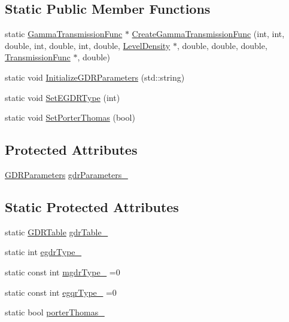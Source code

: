 \subsection*{Static Public Member Functions}
\begin{DoxyCompactItemize}
\item 
static \hyperlink{classGammaTransmissionFunc}{Gamma\-Transmission\-Func} $\ast$ \hyperlink{classGammaTransmissionFunc_af9113434ffae5b7a9ef26ee4edffa9e2}{Create\-Gamma\-Transmission\-Func} (int, int, double, int, double, int, double, \hyperlink{classLevelDensity}{Level\-Density} $\ast$, double, double, double, \hyperlink{classTransmissionFunc}{Transmission\-Func} $\ast$, double)
\item 
static void \hyperlink{classGammaTransmissionFunc_a2e092550258a4f83308f5177230f9ddd}{Initialize\-G\-D\-R\-Parameters} (std\-::string)
\item 
static void \hyperlink{classGammaTransmissionFunc_a3d7d2c3839a6f793a199d86aa17fcecf}{Set\-E\-G\-D\-R\-Type} (int)
\item 
static void \hyperlink{classGammaTransmissionFunc_ad18fc61af1d1f2f1873072456914d62f}{Set\-Porter\-Thomas} (bool)
\end{DoxyCompactItemize}
\subsection*{Protected Attributes}
\begin{DoxyCompactItemize}
\item 
\hyperlink{classGDRParameters}{G\-D\-R\-Parameters} \hyperlink{classGammaTransmissionFunc_a2fc3e55f03a93237061ef5c72077e007}{gdr\-Parameters\-\_\-}
\end{DoxyCompactItemize}
\subsection*{Static Protected Attributes}
\begin{DoxyCompactItemize}
\item 
static \hyperlink{GammaTransmissionFunc_8h_a28a4ad6d778738bd683db90f04b8c50d}{G\-D\-R\-Table} \hyperlink{classGammaTransmissionFunc_a1ce4515fa2b9343208d5a419b3a8a486}{gdr\-Table\-\_\-}
\item 
static int \hyperlink{classGammaTransmissionFunc_a8cad0e61b388a779ef5dceba294e8687}{egdr\-Type\-\_\-}
\item 
static const int \hyperlink{classGammaTransmissionFunc_ae885f247bb9f13b1ff11aca3626e4069}{mgdr\-Type\-\_\-} =0
\item 
static const int \hyperlink{classGammaTransmissionFunc_a04f3aade1b8c0a2d707fb67028c6fe79}{egqr\-Type\-\_\-} =0
\item 
static bool \hyperlink{classGammaTransmissionFunc_a60dd0efc70eea322e8ca51432418cca2}{porter\-Thomas\-\_\-}
\end{DoxyCompactItemize}


